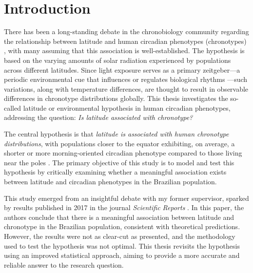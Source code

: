 \documentclass[
12pt,
openright,
oneside,
a4paper,
chapter=TITLE,
section=TITLE,
french,
spanish,
brazil,
english
]{abntex2}
\renewcommand{\contentsname}{Contents}
\renewcommand{\contentsname}{Sumário}
\renewcommand{\contentsname}{Sumario}
\renewcommand{\contentsname}{Sommaire}
\renewcommand{\textual}{
  \pagestyle{abntheadings}
  \aliaspagestyle{chapter}{abntheadings}
}
\renewcommand*\contentsname{Table of Contents}
\newcommand\contentsname{Table of Contents}
\begin{document}

\pdfbookmark[0]{\contentsname}{toc}
\tableofcontents*
\cleardoublepage




\textual
{}

\chapter{Introduction}\label{sec-introduction}

There has been a long-standing debate in the chronobiology community
regarding the relationship between latitude and human circadian
phenotypes (chronotypes)
\autocites[e.g.,][]{bohlen1973,randler2008,leocadio-miguel2017,wang2023},
with many assuming that this association is well-established. The
hypothesis is based on the varying amounts of solar radiation
experienced by populations across different latitudes. Since light
exposure serves as a primary zeitgeber---a periodic environmental cue
that influences or regulates biological rhythms
\autocite{aschoff1960,pittendrigh1960}---such variations, along with
temperature differences, are thought to result in observable differences
in chronotype distributions globally. This thesis investigates the
so-called latitude or environmental hypothesis in human circadian
phenotypes, addressing the question: \emph{Is latitude associated with
chronotype?}

The central hypothesis is that \emph{latitude is associated with human
chronotype distributions}, with populations closer to the equator
exhibiting, on average, a shorter or more morning-oriented circadian
phenotype compared to those living near the poles
\autocite{bohlen1973,randler2008,leocadio-miguel2014,horzum2015,leocadio-miguel2017}.
The primary objective of this study is to model and test this hypothesis
by critically examining whether a meaningful association exists between
latitude and circadian phenotypes in the Brazilian population.

This study emerged from an insightful debate with my former supervisor,
sparked by results published in 2017 in the journal \emph{Scientific
Reports} \autocite{leocadio-miguel2017}. In this paper, the authors
conclude that there is a meaningful association between latitude and
chronotype in the Brazilian population, consistent with theoretical
predictions. However, the results were not as clear-cut as presented,
and the methodology used to test the hypothesis was not optimal. This
thesis revisits the hypothesis using an improved statistical approach,
aiming to provide a more accurate and reliable answer to the research
question.
\end{document}
